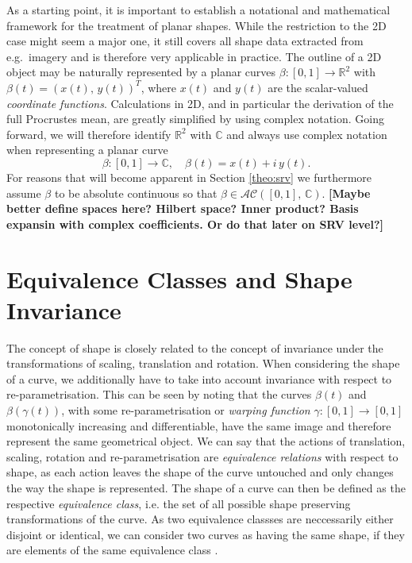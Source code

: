 As a starting point, it is important to establish a notational and mathematical framework for the treatment of planar shapes.
While the restriction to the 2D case might seem a major one, it still covers all shape data extracted from e.g.\ imagery and is therefore very applicable in practice.
The outline of a 2D object may be naturally represented by a planar curves $\beta : [0,1] \rightarrow \mathbb{R}^2$ with $\beta(t) = (x(t),\, y(t))^T$, where $x(t)$ and $y(t)$ are the scalar-valued \textit{coordinate functions}.
Calculations in 2D, and in particular the derivation of the full Procrustes mean, are greatly simplified by using complex notation.
Going forward, we will therefore identify $\mathbb{R}^2$ with $\mathbb{C}$ and always use complex notation when representing a planar curve
$$\beta : [0,1] \rightarrow \mathbb{C}, \quad \beta(t) = x(t) + i\, y(t).$$
For reasons that will become apparent in Section \ref{theo:srv} we furthermore assume $\beta$ to be absolute continuous so that $\beta \in \mathcal{AC}([0,1],\, \mathbb{C})$.
\textbf{[Maybe better define spaces here? Hilbert space? Inner product? Basis expansin with complex coefficients. Or do that later on SRV level?]}




\section{Equivalence Classes and Shape Invariance}
\label{theo:inv}
The concept of shape is closely related to the concept of invariance under the transformations of scaling, translation and rotation.
When considering the shape of a curve, we additionally have to take into account invariance with respect to re-parametrisation.
This can be seen by noting that the curves $\beta(t)$ and $\beta(\gamma(t))$, with some re-parametrisation or \textit{warping function} $\gamma : [0,1] \rightarrow [0,1]$ monotonically increasing and differentiable, have the same image and therefore represent the same geometrical object.
We can say that the actions of translation, scaling, rotation and re-parametrisation are \textit{equivalence relations} with respect to shape, as each action leaves the shape of the curve untouched and only changes the way the shape is represented.
The shape of a curve can then be defined as the respective \textit{equivalence class}, i.e. the set of all possible shape preserving transformations of the curve.
As two equivalence classses are neccessarily either disjoint or identical, we can consider two curves as having the same shape, if they are elements of the same equivalence class \parencite[see][40]{SrivastavaKlassen2016}.

